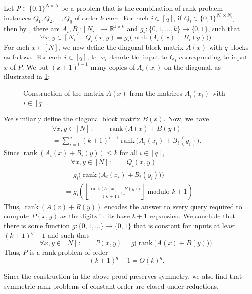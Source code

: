\documentclass[conference]{IEEEtran}
\DeclareMathOperator{\rank}{rank}
\newcommand{\R}{\mathbb{R}}
\begin{document}
\begin{IEEEproof}
	Let $P\in \{0,1\}^{N\times N}$ be a problem that is the combination of rank problem instances $Q_1,Q_2,\dots, Q_q$ of order $k$ each. For each $i\in [q]$, if $Q_i\in \{0,1\}^{N_i\times N_i}$, then by , there are $A_i,B_i\colon [N_i]\to
    \R^{k\times k}$ and $g_i\colon \{0,1,\dots, k\}\to \{0,1\}$, such that 
\[
	\forall x,y\in[N_i]\,\colon\, Q_i(x,y) = g_i\Big(\rank\!\big(A_i(x)+ B_i(y)\big)\Big).
\]
For each $x\in [N]$, we now define the diagonal block matrix $A(x)$ with $q$
blocks as follows. For each $i\in [q]$, let $x_i$ denote the input to $Q_i$
corresponding to input $x$ of $P$. We put $(k+1)^{i-1}$ many copies of
$A_i(x_i)$ on the diagonal, as illustrated in \cref{fig:rank-reduction}:
	
	\begin{figure}[H]
		\begin{center}
			
		\end{center}
		\caption{Construction of the matrix $A(x)$ from the matrices $A_i(x_i)$ with $i\in [q]$.}
        \label{fig:rank-reduction}
	\end{figure}
\noindent
We similarly define the diagonal block matrix $B(x)$. Now, we have
\begin{align*}
    \forall x,y\in[N]\,\colon\qquad \rank\!\big(A(x)+B(y)\big)\\
    =\sum_{i = 1}^q (k+1)^{i-1}\rank\!\Big(A_i(x_i)+B_i(y_i)\Big).
\end{align*}
	Since $\rank(A_i(x)+B_i(y))\leq k$ for all $i\in[q]$,
\begin{align*}
	&\quad\forall x,y\in[N]\,\colon\qquad Q_i(x,y)\\
    &= g_i\Big(\rank\!\big(A_i(x_i)+B_i(y_i)\big)\Big)\\
    &= g_i\left(\left\lfloor\frac{\rank\!\big(A(x)+B(y)\big)}{(k+1)^{i-1}}\right\rfloor \text{ modulo }k+1\right).
\end{align*}
	Thus, $\rank(A(x)+B(y))$ encodes the answer to every query required to
	compute $P(x,y)$ as the digits in its base $k+1$ expansion. We conclude that there is some function $g:\{0,1,\dots\}\to\{0,1\}$ that is constant for inputs at least $(k+1)^q-1$ and such that
	\[
	\forall x,y\in[N]\,\colon\qquad P(x,y) = g\Big(\rank\!\big(A(x)+B(y)\big)\Big).
	\]
	Thus, $P$ is a rank problem of order
    $$(k+1)^q-1 = O(k)^q.$$
\end{IEEEproof}

\begin{remark} \label{rem:symmetry}
	Since the construction in the above proof preserves symmetry, we also find that symmetric rank problems of constant order are closed under reductions.
\end{remark}
\end{document}
